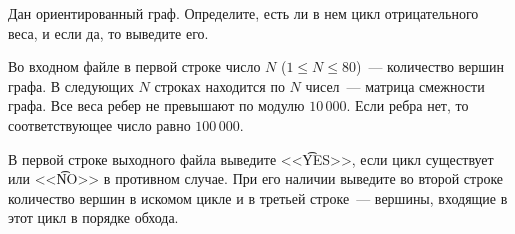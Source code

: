 

Дан ориентированный граф. Определите, есть ли в нем цикл отрицательного веса, и если да, то выведите его.

\InputFile
Во входном файле в первой строке число $N$ ($1 \leqslant N \leqslant 80$)~--- количество вершин графа.
В следующих $N$ строках находится по $N$ чисел~--- матрица смежности графа. Все веса ребер
не превышают по модулю $10\,000$. Если ребра нет, то соответствующее число равно $100\,000$.

\OutputFile
В первой строке выходного файла выведите <<\t{YES}>>, если цикл существует или <<\t{NO}>>  в противном случае.
При его наличии выведите во второй строке количество вершин в искомом цикле и в третьей строке~--- вершины,
входящие в этот цикл в порядке обхода.

